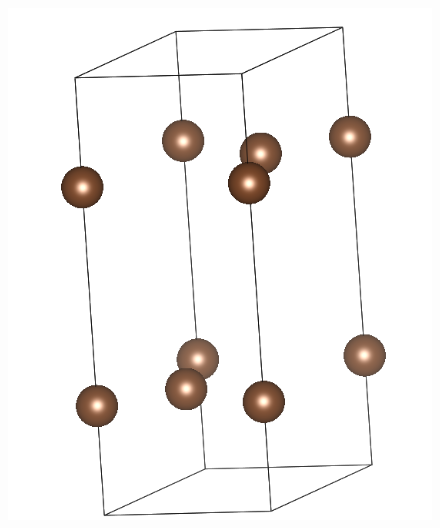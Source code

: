 			\begin{figure}
				\centering
				\begin{minipage}[t]{0.25\textwidth}
					\includegraphics[width=\textwidth,  angle=-3]{Results/Figures/Graphite_get_sym.png}
				\end{minipage}
				\begin{minipage}[t]{0.2\textwidth}

\end{minipage}
\end{figure}
